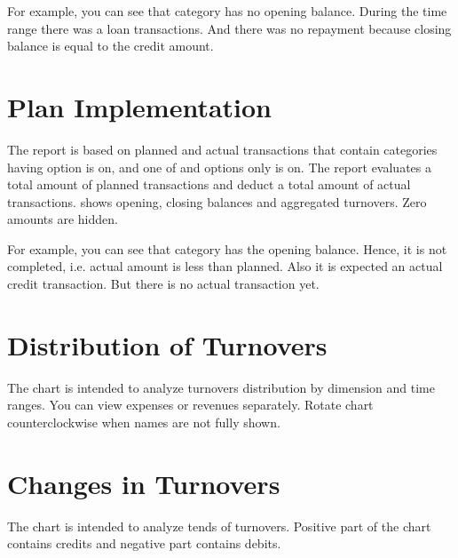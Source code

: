 \documentclass[a4paper,10pt,english]{sphinxmanual}
\begin{document}
\sphinxAtStartPar
For example, you can see that  category has no opening balance.
During the time range there was a loan transactions. And there was no repayment because
closing balance is equal to the credit amount.


\section{Plan Implementation}
\label{\detokenize{reports:plan-implementation}}
\sphinxAtStartPar
The report is based on planned and actual transactions that contain categories having
 option is on, and one of 
and  options only is on. The report evaluates a total
amount of planned transactions and deduct a total amount of actual transactions.
 shows opening,
closing balances and aggregated turnovers. Zero amounts are hidden.

\sphinxAtStartPar
For example, you can see that  category has the opening balance.
Hence, it is not completed, i.e. actual amount is less than planned.
Also it is expected an actual credit transaction. But there is no
actual transaction yet.

\noindent{}

\noindent{}

\noindent{}


\section{Distribution of Turnovers}
\label{\detokenize{reports:distribution-of-turnovers}}
\sphinxAtStartPar
The chart is intended to analyze turnovers distribution by dimension and time ranges. You can view
expenses or revenues separately. Rotate chart counterclockwise when names are not fully shown.


\section{Changes in Turnovers}
\label{\detokenize{reports:changes-in-turnovers}}
\sphinxAtStartPar
The chart is intended to analyze tends of turnovers. Positive part of the chart contains
credits and negative part contains debits.
\end{document}
